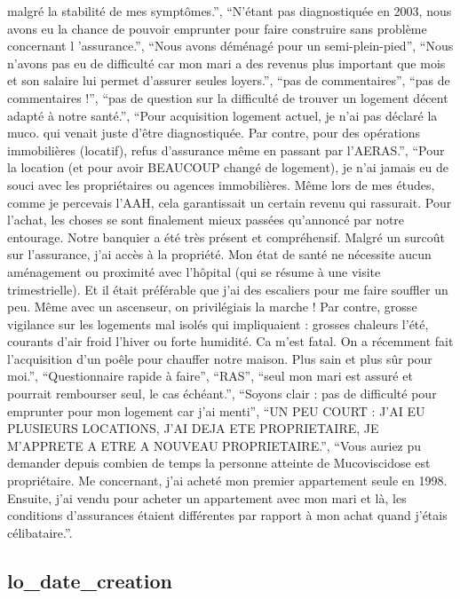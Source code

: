 \documentclass[
  letterpaper,
  DIV=11,
  numbers=noendperiod]{scrartcl}
\begin{document}
\begin{itemize}
  malgré la stabilité de mes symptômes.'', ``N'étant pas diagnostiquée
  en 2003, nous avons eu la chance de pouvoir emprunter pour faire
  construire sans problème concernant l 'assurance.'', ``Nous avons
  déménagé pour un semi-plein-pied'', ``Nous n'avons pas eu de
  difficulté car mon mari a des revenus plus important que mois et son
  salaire lui permet d'assurer seules loyers.'', ``pas de
  commentaires'', ``pas de commentaires !'', ``pas de question sur la
  difficulté de trouver un logement décent adapté à notre santé.'',
  ``Pour acquisition logement actuel, je n'ai pas déclaré la muco. qui
  venait juste d'être diagnostiquée. Par contre, pour des opérations
  immobilières (locatif), refus d'assurance même en passant par
  l'AERAS.'', ``Pour la location (et pour avoir BEAUCOUP changé de
  logement), je n'ai jamais eu de souci avec les propriétaires ou
  agences immobilières. Même lors de mes études, comme je percevais
  l'AAH, cela garantissait un certain revenu qui rassurait. Pour
  l'achat, les choses se sont finalement mieux passées qu'annoncé par
  notre entourage. Notre banquier a été très présent et compréhensif.
  Malgré un surcoût sur l'assurance, j'ai accès à la propriété. Mon état
  de santé ne nécessite aucun aménagement ou proximité avec l'hôpital
  (qui se résume à une visite trimestrielle). Et il était préférable que
  j'ai des escaliers pour me faire souffler un peu. Même avec un
  ascenseur, on privilégiais la marche ! Par contre, grosse vigilance
  sur les logements mal isolés qui impliquaient : grosses chaleurs
  l'été, courants d'air froid l'hiver ou forte humidité. Ca m'est fatal.
  On a récemment fait l'acquisition d'un poêle pour chauffer notre
  maison. Plus sain et plus sûr pour moi.'', ``Questionnaire rapide à
  faire'', ``RAS'', ``seul mon mari est assuré et pourrait rembourser
  seul, le cas échéant.'', ``Soyons clair : pas de difficulté pour
  emprunter pour mon logement car j'ai menti'', ``UN PEU COURT : J'AI EU
  PLUSIEURS LOCATIONS, J'AI DEJA ETE PROPRIETAIRE, JE M'APPRETE A ETRE A
  NOUVEAU PROPRIETAIRE.'', ``Vous auriez pu demander depuis combien de
  temps la personne atteinte de Mucoviscidose est propriétaire. Me
  concernant, j'ai acheté mon premier appartement seule en 1998.
  Ensuite, j'ai vendu pour acheter un appartement avec mon mari et là,
  les conditions d'assurances étaient différentes par rapport à mon
  achat quand j'étais célibataire.''.
\end{itemize}

\fullline

\subsection{lo\_date\_creation}\label{lo_date_creation}
\end{document}

